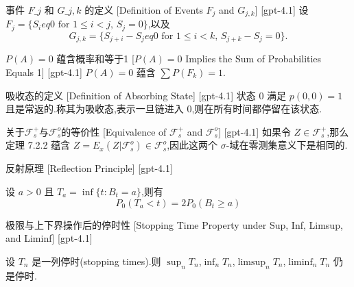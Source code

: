 \documentclass[UTF8]{ctexart}
\begin{document}
    
    
    \begin{dfn}
        {事件 $F\_j$ 和 $G\_{j,k}$ 的定义}
        [Definition of Events $F_j$ and $G_{j,k}$]
        [gpt-4.1]
        设 $F_{j} = \{ S_{i} 
eq 0 \text{ for } 1 \leq i < j,\, S_{j} = 0 \}$,以及
\[
G_{j,k} = \{ S_{j+i} - S_{j} 
eq 0 \text{ for } 1 \leq i < k,\, S_{j+k} - S_{j} = 0 \}.
\]

    \end{dfn}
    
    
    
    \begin{crl}
        [$PA-=-0$-Implies-the-Sum-of-Probabilities-Equals-1]
        {$P(A) = 0$ 蕴含概率和等于1}
        [$P(A) = 0$ Implies the Sum of Probabilities Equals 1]
        [gpt-4.1]
        $P(A) = 0$ 蕴含 $\sum P(F_{k}) = 1$.
    \end{crl}
    
    
    
    \begin{dfn}
        {吸收态的定义}
        [Definition of Absorbing State]
        [gpt-4.1]
        状态 $0$ 满足 $p ( 0 , 0 ) = 1$ 且是常返的.称其为吸收态,表示一旦链进入 $0$,则在所有时间都停留在该状态.
    \end{dfn}
    
    
    
    \begin{thm}
        {关于$\mathcal{F}_{s}^{+}$与$\mathcal{F}_{s}^{o}$的等价性}
        [Equivalence of $\mathcal{F}_{s}^{+}$ and $\mathcal{F}_{s}^{o}$]
        [gpt-4.1]
        如果令 $Z \in \mathcal{F}_{s}^{+}$,那么定理 7.2.2 蕴含 $Z = E_x ( Z | \mathcal{F}_{s}^{o} ) \in \mathcal{F}_{s}^{o}$,因此这两个 $\sigma$-域在零测集意义下是相同的.
    \end{thm}
    
    
    
    \begin{thm}
        {反射原理}
        [Reflection Principle]
        [gpt-4.1]
        
设 $a > 0$ 且 $T_{a} = \inf\{t : B_{t} = a\}$,则有
\[
P_{0}(T_{a} < t) = 2P_{0}(B_{t} \geq a)
\]

    \end{thm}
    
    
    
    \begin{thm}
        {极限与上下界操作后的停时性}
        [Stopping Time Property under Sup, Inf, Limsup, and Liminf]
        [gpt-4.1]
        
设 $T_{n}$ 是一列停时(stopping times).则 $\sup_{n} T_{n}$,$\inf_{n} T_{n}$,$\limsup_{n} T_{n}$,$\liminf_{n} T_{n}$ 仍是停时.

    \end{thm}
    
\end{document}
